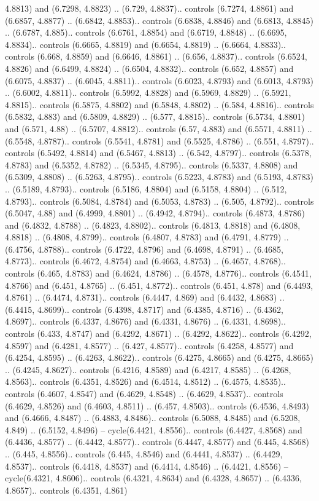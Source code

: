 4.8813) and (6.7298, 4.8823) .. (6.729, 4.8837).. controls (6.7274, 4.8861) and (6.6857, 4.8877) .. (6.6842, 4.8853).. controls (6.6838, 4.8846) and (6.6813, 4.8845) .. (6.6787, 4.885).. controls (6.6761, 4.8854) and (6.6719, 4.8848) .. (6.6695, 4.8834).. controls (6.6665, 4.8819) and (6.6654, 4.8819) .. (6.6664, 4.8833).. controls (6.668, 4.8859) and (6.6646, 4.8861) .. (6.656, 4.8837).. controls (6.6524, 4.8826) and (6.6499, 4.8824) .. (6.6504, 4.8832).. controls (6.652, 4.8857) and (6.6075, 4.8837) .. (6.6045, 4.8811).. controls (6.6023, 4.8793) and (6.6013, 4.8793) .. (6.6002, 4.8811).. controls (6.5992, 4.8828) and (6.5969, 4.8829) .. (6.5921, 4.8815).. controls (6.5875, 4.8802) and (6.5848, 4.8802) .. (6.584, 4.8816).. controls (6.5832, 4.883) and (6.5809, 4.8829) .. (6.577, 4.8815).. controls (6.5734, 4.8801) and (6.571, 4.88) .. (6.5707, 4.8812).. controls (6.57, 4.883) and (6.5571, 4.8811) .. (6.5548, 4.8787).. controls (6.5541, 4.8781) and (6.5525, 4.8786) .. (6.551, 4.8797).. controls (6.5492, 4.8814) and (6.5467, 4.8813) .. (6.542, 4.8797).. controls (6.5378, 4.8783) and (6.5352, 4.8782) .. (6.5345, 4.8795).. controls (6.5337, 4.8808) and (6.5309, 4.8808) .. (6.5263, 4.8795).. controls (6.5223, 4.8783) and (6.5193, 4.8783) .. (6.5189, 4.8793).. controls (6.5186, 4.8804) and (6.5158, 4.8804) .. (6.512, 4.8793).. controls (6.5084, 4.8784) and (6.5053, 4.8783) .. (6.505, 4.8792).. controls (6.5047, 4.88) and (6.4999, 4.8801) .. (6.4942, 4.8794).. controls (6.4873, 4.8786) and (6.4832, 4.8788) .. (6.4823, 4.8802).. controls (6.4813, 4.8818) and (6.4808, 4.8818) .. (6.4808, 4.8799).. controls (6.4807, 4.8783) and (6.4791, 4.8779) .. (6.4756, 4.8788).. controls (6.4722, 4.8796) and (6.4698, 4.8791) .. (6.4685, 4.8773).. controls (6.4672, 4.8754) and (6.4663, 4.8753) .. (6.4657, 4.8768).. controls (6.465, 4.8783) and (6.4624, 4.8786) .. (6.4578, 4.8776).. controls (6.4541, 4.8766) and (6.451, 4.8765) .. (6.451, 4.8772).. controls (6.451, 4.878) and (6.4493, 4.8761) .. (6.4474, 4.8731).. controls (6.4447, 4.869) and (6.4432, 4.8683) .. (6.4415, 4.8699).. controls (6.4398, 4.8717) and (6.4385, 4.8716) .. (6.4362, 4.8697).. controls (6.4337, 4.8676) and (6.4331, 4.8676) .. (6.4331, 4.8698).. controls (6.433, 4.8747) and (6.4292, 4.8671) .. (6.4292, 4.8622).. controls (6.4292, 4.8597) and (6.4281, 4.8577) .. (6.427, 4.8577).. controls (6.4258, 4.8577) and (6.4254, 4.8595) .. (6.4263, 4.8622).. controls (6.4275, 4.8665) and (6.4275, 4.8665) .. (6.4245, 4.8627).. controls (6.4216, 4.8589) and (6.4217, 4.8585) .. (6.4268, 4.8563).. controls (6.4351, 4.8526) and (6.4514, 4.8512) .. (6.4575, 4.8535).. controls (6.4607, 4.8547) and (6.4629, 4.8548) .. (6.4629, 4.8537).. controls (6.4629, 4.8526) and (6.4603, 4.8511) .. (6.457, 4.8503).. controls (6.4536, 4.8493) and (6.4666, 4.8487) .. (6.4883, 4.8486).. controls (6.5088, 4.8485) and (6.5208, 4.849) .. (6.5152, 4.8496) -- cycle(6.4421, 4.8556).. controls (6.4427, 4.8568) and (6.4436, 4.8577) .. (6.4442, 4.8577).. controls (6.4447, 4.8577) and (6.445, 4.8568) .. (6.445, 4.8556).. controls (6.445, 4.8546) and (6.4441, 4.8537) .. (6.4429, 4.8537).. controls (6.4418, 4.8537) and (6.4414, 4.8546) .. (6.4421, 4.8556) -- cycle(6.4321, 4.8606).. controls (6.4321, 4.8634) and (6.4328, 4.8657) .. (6.4336, 4.8657).. controls (6.4351, 4.861) 